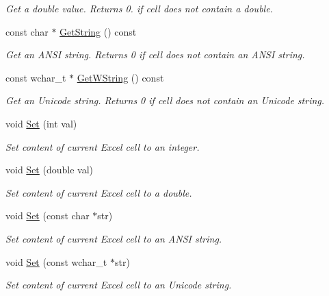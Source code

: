 \begin{DoxyCompactItemize}
\begin{DoxyCompactList}\small\item\em Get a double value. Returns 0. if cell does not contain a double. \end{DoxyCompactList}\item 
const char $\ast$ \hyperlink{class_y_excel_1_1_basic_excel_cell_a11e8949cc243df9682b82e68b121e913}{Get\+String} () const 
\begin{DoxyCompactList}\small\item\em Get an A\+N\+S\+I string. Returns 0 if cell does not contain an A\+N\+S\+I string. \end{DoxyCompactList}\item 
const wchar\+\_\+t $\ast$ \hyperlink{class_y_excel_1_1_basic_excel_cell_add6c90c942dd197d60eea5dddc5ae816}{Get\+W\+String} () const 
\begin{DoxyCompactList}\small\item\em Get an Unicode string. Returns 0 if cell does not contain an Unicode string. \end{DoxyCompactList}\item 
void \hyperlink{class_y_excel_1_1_basic_excel_cell_a18001f12f853f12dd28d40af66a29fa5}{Set} (int val)
\begin{DoxyCompactList}\small\item\em Set content of current Excel cell to an integer. \end{DoxyCompactList}\item 
void \hyperlink{class_y_excel_1_1_basic_excel_cell_a98daa58a6325a20f801579e3bc23282b}{Set} (double val)
\begin{DoxyCompactList}\small\item\em Set content of current Excel cell to a double. \end{DoxyCompactList}\item 
void \hyperlink{class_y_excel_1_1_basic_excel_cell_a5697b81458fa089cedd53451c9188438}{Set} (const char $\ast$str)
\begin{DoxyCompactList}\small\item\em Set content of current Excel cell to an A\+N\+S\+I string. \end{DoxyCompactList}\item 
void \hyperlink{class_y_excel_1_1_basic_excel_cell_a6eb319f73d522972f1136606e77cd773}{Set} (const wchar\+\_\+t $\ast$str)
\begin{DoxyCompactList}\small\item\em Set content of current Excel cell to an Unicode string. \end{DoxyCompactList}\item 

\end{DoxyCompactItemize}
